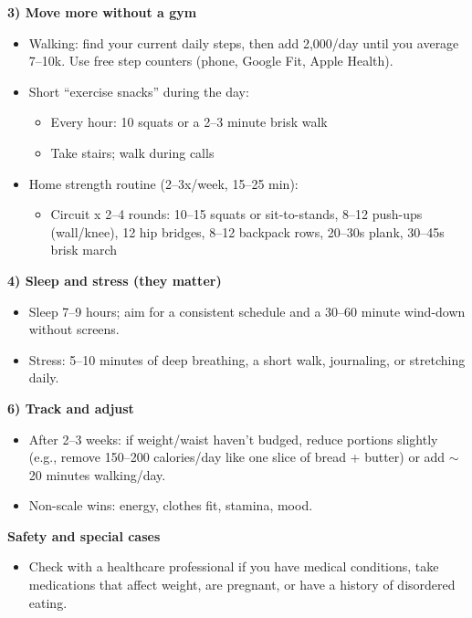 \begin{responsebox}
\textbf{3) Move more without a gym}
\begin{itemize}[noitemsep, topsep=0pt]
    \item Walking: find your current daily steps, then add 2,000/day until you average 7–10k. Use free step counters (phone, Google Fit, Apple Health).
    \item Short “exercise snacks” during the day:
    \begin{itemize}[noitemsep]
        \item Every hour: 10 squats or a 2–3 minute brisk walk
        \item Take stairs; walk during calls
    \end{itemize}
    \item Home strength routine (2–3x/week, 15–25 min):
    \begin{itemize}[noitemsep]
        \item Circuit x 2–4 rounds: 10–15 squats or sit-to-stands, 8–12 push-ups (wall/knee), 12 hip bridges, 8–12 backpack rows, 20–30s plank, 30–45s brisk march
    \end{itemize}
\end{itemize}

\textbf{4) Sleep and stress (they matter)}
\begin{itemize}[noitemsep, topsep=0pt]
    \item Sleep 7–9 hours; aim for a consistent schedule and a 30–60 minute wind-down without screens.
    \item Stress: 5–10 minutes of deep breathing, a short walk, journaling, or stretching daily.
\end{itemize}

\textbf{6) Track and adjust}
\begin{itemize}[noitemsep, topsep=0pt]
    \item After 2–3 weeks: if weight/waist haven’t budged, reduce portions slightly (e.g., remove 150–200 calories/day like one slice of bread + butter) or add $\sim$20 minutes walking/day.
    \item Non-scale wins: energy, clothes fit, stamina, mood.
\end{itemize}

\textbf{Safety and special cases}
\begin{itemize}[noitemsep, topsep=0pt]
    \item Check with a healthcare professional if you have medical conditions, take medications that affect weight, are pregnant, or have a history of disordered eating.
\end{itemize}

\end{responsebox}

